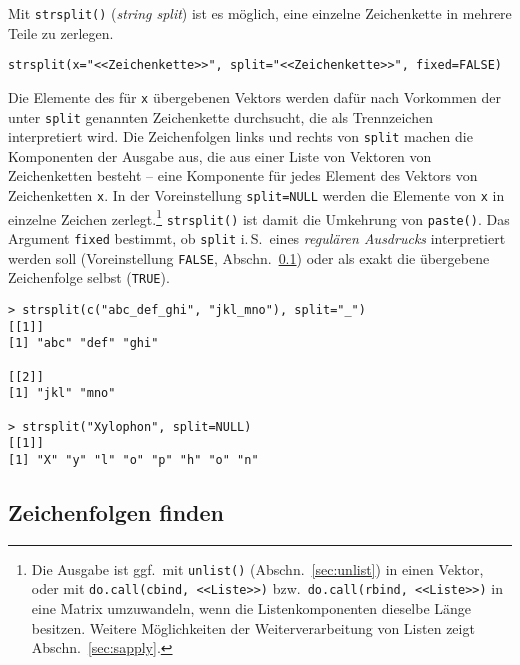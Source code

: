 Mit \lstinline!strsplit()! (\emph{string split}) ist es möglich, eine einzelne Zeichenkette in mehrere Teile zu zerlegen.
\begin{lstlisting}
strsplit(x="<<Zeichenkette>>", split="<<Zeichenkette>>", fixed=FALSE)
\end{lstlisting}

Die Elemente des für \lstinline!x! übergebenen Vektors werden dafür nach Vorkommen der unter \lstinline!split! genannten Zeichenkette durchsucht, die als Trennzeichen interpretiert wird. Die Zeichenfolgen links und rechts von \lstinline!split! machen die Komponenten der Ausgabe aus, die aus einer Liste von Vektoren von Zeichenketten besteht -- eine Komponente für jedes Element des Vektors von Zeichenketten \lstinline!x!. In der Voreinstellung \lstinline!split=NULL! werden die Elemente von \lstinline!x! in einzelne Zeichen zerlegt.\footnote{Die Ausgabe ist ggf.\ mit \lstinline!unlist()! (Abschn.\ \ref{sec:unlist}) in einen Vektor, oder mit \lstinline!do.call(cbind, <<Liste>>)! bzw.\ \lstinline!do.call(rbind, <<Liste>>)! in eine Matrix umzuwandeln, wenn die Listenkomponenten dieselbe Länge besitzen. Weitere Möglichkeiten der Weiterverarbeitung von Listen zeigt Abschn.\ \ref{sec:sapply}.} \lstinline!strsplit()! ist damit die Umkehrung von \lstinline!paste()!. Das Argument \lstinline!fixed! bestimmt, ob \lstinline!split! i.\,S.\ eines \emph{regulären Ausdrucks} interpretiert werden soll (Voreinstellung \lstinline!FALSE!, Abschn.\ \ref{sec:grep}) oder als exakt die übergebene Zeichenfolge selbst (\lstinline!TRUE!).
\begin{lstlisting}
> strsplit(c("abc_def_ghi", "jkl_mno"), split="_")
[[1]]
[1] "abc" "def" "ghi"

[[2]]
[1] "jkl" "mno"

> strsplit("Xylophon", split=NULL)
[[1]]
[1] "X" "y" "l" "o" "p" "h" "o" "n"
\end{lstlisting}

\subsection{Zeichenfolgen finden}
\label{sec:grep}

